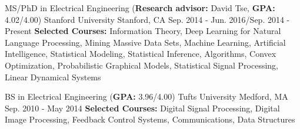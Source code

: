 

\begin{cventries}

  \cventry
    {MS/PhD in Electrical Engineering (\textbf{Research advisor:} David Tse, \textbf{GPA:} 4.02/4.00)} %
    {Stanford University} %
    {Stanford, CA} %
    {Sep. 2014 - Jun. 2016/Sep. 2014 - Present} %
    {\textbf{Selected Courses:} Information Theory, Deep Learning for Natural Language Processing, Mining Massive Data Sets, Machine Learning, Artificial Intelligence, Statistical Modeling, Statistical Inference, Algorithms, Convex Optimization, Probabilistic Graphical Models, Statistical Signal Processing, Linear Dynamical Systems }
    
  \cventry
    {BS in Electrical Engineering (\textbf{GPA:} 3.96/4.00)} %
    {Tufts University} %
    {Medford, MA} %
    {Sep. 2010 - May 2014} %
	{\textbf{Selected Courses:} Digital Signal Processing, Digital Image Processing, Feedback Control  Systems, Communications, Data Structures}
\end{cventries}

